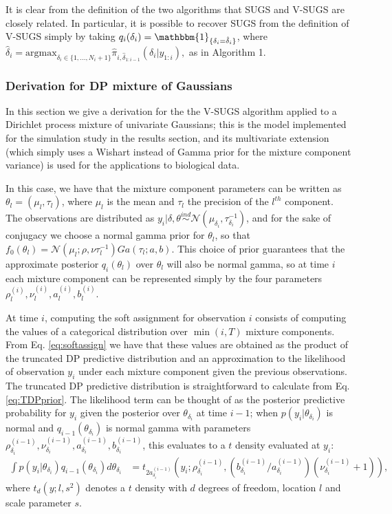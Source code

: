 \documentclass{uwstat572}
\begin{document}
It is clear from the definition of the two algorithms that SUGS and V-SUGS are closely related. In particular, it is possible to recover SUGS from the definition of V-SUGS simply by taking $q_i(\delta_i) = \mathbbm{1}_{\{\delta_i = \hat{\delta}_i\}}$, where $\hat{\delta}_i = \mathrm{argmax}_{\delta_i \in \{1,...,N_i+1\}} \hat{\pi}_{i,\hat{\delta}_{1:i-1}}(\delta_i | y_{1:i}),$ as in Algorithm 1.

\subsubsection{Derivation for DP mixture of Gaussians}

In this section we give a derivation for the the V-SUGS algorithm applied to a Dirichlet process mixture of univariate Gaussians; this is the model implemented for the simulation study in the results section, and its multivariate extension (which simply uses a Wishart instead of Gamma prior for the mixture component variance) is used for the applications to biological data.

In this case, we have that the mixture component parameters can be written as $\theta_l = (\mu_l,\tau_l)$, where $\mu_l$ is the mean and $\tau_l$ the precision of the $l^{th}$ component. The observations are distributed as $y_i | \delta, \theta \overset{ind}{\sim} \mathcal{N}(\mu_{\delta_i},\tau_{\delta_i}^{-1})$, and for the sake of conjugacy we choose a normal gamma prior for $\theta_l$, so that $f_0(\theta_l) = \mathcal{N}(\mu_l;\rho, \nu \tau_l^{-1})Ga(\tau_l; a,b)$. This choice of prior guarantees that the approximate posterior $q_i(\theta_l)$ over $\theta_l$ will also be normal gamma, so at time $i$ each mixture component can be represented simply by the four parameters $\rho_l^{(i)}, \nu_l^{(i)}, a_l^{(i)}, b_l^{(i)}$. 

At time $i$, computing the soft assignment for observation $i$ consists of computing the values of a categorical distribution over $\min(i,T)$ mixture components. From Eq. \ref{eq:softassign} we have that these values are obtained as the product of the truncated DP predictive distribution and an approximation to the likelihood of observation $y_i$ under each mixture component given the previous observations. The truncated DP predictive distribution is straightforward to calculate from Eq. \ref{eq:TDPprior}. The likelihood term can be thought of as the posterior predictive probability for $y_i$ given the posterior over $\theta_{\delta_i}$ at time $i-1$; when $p(y_i | \theta_{\delta_i})$ is normal and $q_{i-1}(\theta_{\delta_i})$ is normal gamma with parameters $\rho_{\delta_i}^{(i-1)}, \nu_{\delta_i}^{(i-1)}, a_{\delta_i}^{(i-1)}, b_{\delta_i}^{(i-1)}$, this evaluates to a $t$ density evaluated at $y_i$:
\begin{align} \int p(y_i | \theta_{\delta_i}) q_{i-1}(\theta_{\delta_i}) d\theta_{\delta_i} &= t_{2a_{\delta_i}^{(i-1)}}(y_i ; \rho_{\delta_i}^{(i-1)}, (b_{\delta_i}^{(i-1)} / a_{\delta_i}^{(i-1)}) (\nu_{\delta_i}^{(i-1)}+1)),\label{eq:mog_tdens} \end{align}
where $t_d(y;l,s^2)$ denotes a $t$ density with $d$ degrees of freedom, location $l$ and scale parameter $s$.
\end{document}
